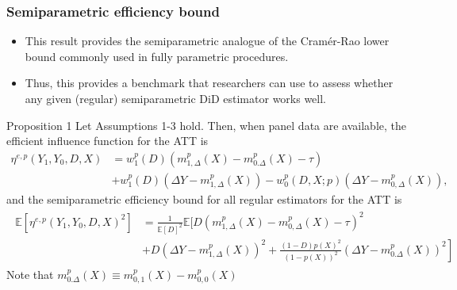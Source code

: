 \documentclass{beamer}
\begin{document}
\begin{frame}\frametitle{Semiparametric efficiency bound}
    \footnotesize
    \begin{itemize}
        \item This result provides the semiparametric analogue of the Cram\'{e}r-Rao lower bound commonly used in fully parametric procedures.
        \item Thus, this provides a benchmark that researchers can use to assess whether any given (regular) semiparametric DiD estimator works well.
    \end{itemize}
    \normalsize
    \begin{block}{Proposition 1}
        \footnotesize
        Let Assumptions 1-3 hold. Then, when panel data are available, the efficient influence function for the ATT is 
        \normalsize
        \footnotesize
        \begin{align*}
            \eta^{e,p}(Y_{1}, Y_{0}, D, X) &= w^{p}_{1}(D)(m^{p}_{1, \Delta}(X) - m^{p}_{0. \Delta}(X) - \tau) \\
            & + w^{p}_{1}(D)(\Delta Y - m^{p}_{1, \Delta}(X)) - w^{p}_{0}(D,X;p)(\Delta Y - m^{p}_{0, \Delta}(X)),
        \end{align*}
        \normalsize
        \footnotesize
        and the semiparametric efficiency bound for all regular estimators for the ATT is 
        \normalsize
        \footnotesize
        \begin{align*}
            \begin{split}
                \mathbb{E}[\eta^{e,p}(Y_{1}, Y_{0}, D, X)^{2}] &= \frac{1}{\mathbb{E}[D]^{2}}\mathbb{E} \biggr[ D(m^{p}_{1, \Delta}(X) - m^{p}_{0,\Delta}(X) - \tau)^{2} 
                \\&+ \left. D(\Delta Y - m^{p}_{1, \Delta}(X))^{2} + \frac{(1-D)p(X)^{2}}{(1-p(X))^{2}}(\Delta Y - m^{p}_{0. \Delta}(X))^{2} \right]
            \end{split}
        \end{align*}
        Note that $m^{p}_{0.\Delta}(X) \equiv m^{p}_{0,1}(X) - m^{p}_{0,0}(X)$
        \normalsize
    \end{block}
\end{frame}
\end{document}
